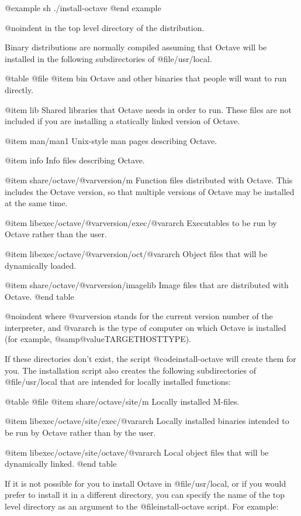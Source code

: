 @example
sh ./install-octave
@end example

@noindent
in the top level directory of the distribution.

Binary distributions are normally compiled assuming that Octave will be
installed in the following subdirectories of @file{/usr/local}.

@table @file
@item bin
Octave and other binaries that people will want to run directly.

@item lib
Shared libraries that Octave needs in order to run.  These files are
not included if you are installing a statically linked version of
Octave.

@item man/man1
Unix-style man pages describing Octave.

@item info
Info files describing Octave.

@item share/octave/@var{version}/m
Function files distributed with Octave.  This includes the Octave
version, so that multiple versions of Octave may be installed at the
same time.

@item libexec/octave/@var{version}/exec/@var{arch}
Executables to be run by Octave rather than the user.

@item libexec/octave/@var{version}/oct/@var{arch}
Object files that will be dynamically loaded.

@item share/octave/@var{version}/imagelib
Image files that are distributed with Octave.
@end table

@noindent
where @var{version} stands for the current version number of the
interpreter, and @var{arch} is the type of computer on which Octave
is installed (for example, @samp{@value{TARGETHOSTTYPE}}).

If these directories don't exist, the script @code{install-octave} will
create them for you.  The installation script also creates the following
subdirectories of @file{/usr/local} that are intended for locally
installed functions:

@table @file
@item share/octave/site/m
Locally installed M-files.

@item libexec/octave/site/exec/@var{arch}
Locally installed binaries intended to be run by Octave rather than by
the user.

@item libexec/octave/site/octave/@var{arch}
Local object files that will be dynamically linked.
@end table

If it is not possible for you to install Octave in @file{/usr/local}, or
if you would prefer to install it in a different directory, you can
specify the name of the top level directory as an argument to the
@file{install-octave} script.  For example:

